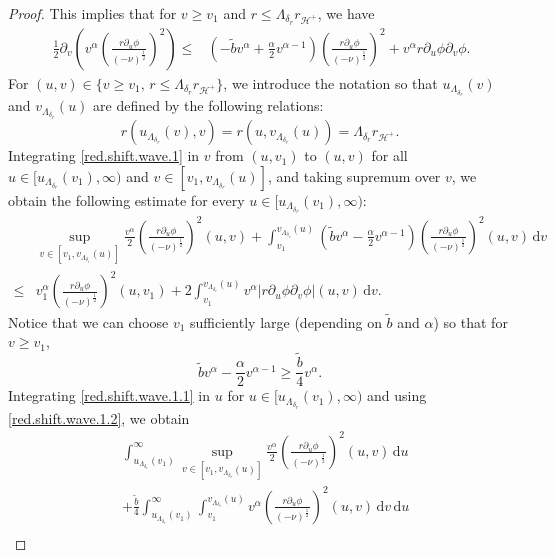 \documentclass[10pt, reqno]{amsart}
\theoremstyle{definition}
\theoremstyle{remark}
\theoremstyle{conjecture}
\numberwithin{equation}{section}
\newcommand{\set}[1]{\{#1\}}
\newcommand{\ud}{\mathrm{d}}
\newcommand{\rd}{\partial}
\newcommand{\0}{\emptyset}
\newcommand{\alp}{\alpha}
\newcommand{\dlt}{\delta}
\newcommand{\Lmb}{\Lambda}
\newcommand{\calH}{\mathcal H}
\newcommand{\f}{\frac}
\newcommand{\de}{\delta}
\newcommand{\EH}{\calH^{+}}
\begin{document}
\begin{proof}
This implies that for $v\geq v_1$ and $r\leq \Lambda_{\de_r} r_{\EH}$, we have
\begin{equation}\label{red.shift.wave.1}
\begin{split}\
\f 12\rd_v\left(v^{\alp}\left(\f{r\rd_u\phi}{(-\nu)^{\f 12}}\right)^2\right)
\leq &\left(-\tilde{b} v^{\alp}+\f{\alp}{2}v^{\alp-1}\right)\left(\f{r\rd_u\phi}{(-\nu)^{\f 12}}\right)^2+v^{\alp} r\rd_u\phi\rd_v\phi.
\end{split}
\end{equation}
For $(u, v) \in \set{v \geq v_{1}, \, r \leq \Lmb_{\dlt_{r}} r_{\EH}}$, we introduce the notation so that $u_{\Lambda_{\de_r}}(v)$ and $v_{\Lambda_{\de_r}}(u)$ are defined by the following relations:
$$r(u_{\Lambda_{\de_r}}(v), v)=r(u, v_{\Lambda_{\de_r}}(u))=\Lambda_{\de_r} r_{\EH}.$$
Integrating \eqref{red.shift.wave.1} in $v$ from $(u,v_1)$ to $(u, v)$ for all $u\in [u_{\Lambda_{\de_r}}(v_1),\infty)$ and $v\in [v_1, v_{\Lambda_{\de_r}}(u)]$, and taking supremum over $v$, we obtain the following estimate for every $u\in [u_{\Lambda_{\de_r}}(v_1),\infty)$:
\begin{equation}\label{red.shift.wave.1.1}
\begin{split}
&\sup_{v\in [v_1, v_{\Lambda_{\de_r}}(u)]}\f {v^{\alp}}2 \left(\f{r\rd_u\phi}{(-\nu)^{\f 12}}\right)^2(u,v)+\int_{v_1}^{v_{\Lambda_{\de_r}}(u)} \left(\tilde{b} v^{\alp}-\f{\alp}{2}v^{\alp-1}\right)\left(\f{r\rd_u\phi}{(-\nu)^{\f 12}}\right)^2(u,v)\,\ud v\\
\leq & v_1^{\alp}\left(\f{r\rd_u\phi}{(-\nu)^{\f 12}}\right)^2(u,v_1)+2\int_{v_1}^{v_{\Lambda_{\de_r}}(u)} v^{\alp} \left|r\rd_u\phi\rd_v\phi\right|(u,v)\,\ud v.
\end{split}
\end{equation}
Notice that we can choose $v_1$ sufficiently large (depending on $\tilde{b}$ and $\alp$) so that for $v\geq v_1$,
\begin{equation}\label{red.shift.wave.1.2}
\tilde{b} v^{\alp}-\f{\alp}{2}v^{\alp-1}\geq \f {\tilde{b}}4 v^{\alp} .
\end{equation}
Integrating \eqref{red.shift.wave.1.1} in $u$ for $u\in [u_{\Lambda_{\de_r}}(v_1),\infty)$ and using \eqref{red.shift.wave.1.2}, we obtain
\begin{equation}\label{red.shift.wave.1.3}
\begin{split}
&\int_{u_{\Lambda_{\de_r}}(v_1)}^\infty\sup_{v\in [v_1, v_{\Lambda_{\de_r}}(u)]}\f {v^{\alp}}2 \left(\f{r\rd_u\phi}{(-\nu)^{\f 12}}\right)^2(u,v)\, \ud u\\
&+\f {\tilde{b}}4\int_{u_{\Lambda_{\de_r}}(v_1)}^\infty\int_{v_1}^{v_{\Lambda_{\de_r}}(u)}  v^{\alp}\left(\f{r\rd_u\phi}{(-\nu)^{\f 12}}\right)^2(u,v)\,\ud v\, \ud u\\

\end{split}
\end{equation}
\end{proof}
\end{document}
